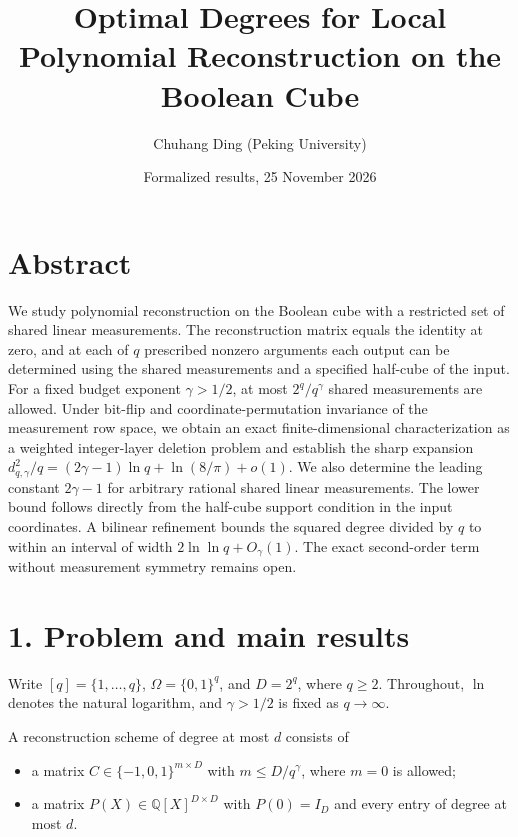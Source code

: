 \documentclass[
  10pt,
]{article}
\title{Optimal Degrees for Local Polynomial Reconstruction on the Boolean Cube}
\author{Chuhang Ding (Peking University)}
\date{Formalized results, 25 November 2026}
\providecommand{\tightlist}{%
  \setlength{\itemsep}{0pt}\setlength{\parskip}{0pt}}
\begin{document}
\maketitle

\section{Abstract}\label{abstract}

We study polynomial reconstruction on the Boolean cube with a restricted set of shared linear measurements. The reconstruction matrix equals the identity at zero, and at each of \(q\) prescribed nonzero arguments each output can be determined using the shared measurements and a specified half-cube of the input. For a fixed budget exponent \(\gamma>1/2\), at most \(2^q/q^\gamma\) shared measurements are allowed. Under bit-flip and coordinate-permutation invariance of the measurement row space, we obtain an exact finite-dimensional characterization as a weighted integer-layer deletion problem and establish the sharp expansion \(d_{q,\gamma}^2/q=(2\gamma-1)\ln q+\ln(8/\pi)+o(1)\). We also determine the leading constant \(2\gamma-1\) for arbitrary rational shared linear measurements. The lower bound follows directly from the half-cube support condition in the input coordinates. A bilinear refinement bounds the squared degree divided by \(q\) to within an interval of width \(2\ln\ln q+O_\gamma(1)\). The exact second-order term without measurement symmetry remains open.

\section{1. Problem and main results}\label{problem-and-main-results}

Write \([q]=\{1,\ldots,q\}\), \(\Omega=\{0,1\}^q\), and \(D=2^q\), where \(q\ge2\). Throughout, \(\ln\) denotes the natural logarithm, and \(\gamma>1/2\) is fixed as \(q\to\infty\).

A reconstruction scheme of degree at most \(d\) consists of

\begin{itemize}
\tightlist
\item
  a matrix \(C\in\{-1,0,1\}^{m\times D}\) with \(m\le D/q^\gamma\), where \(m=0\) is allowed;
\item
  a matrix \(P(X)\in\mathbb Q[X]^{D\times D}\) with \(P(0)=I_D\) and every entry of degree at most \(d\).
\end{itemize}
\end{document}
